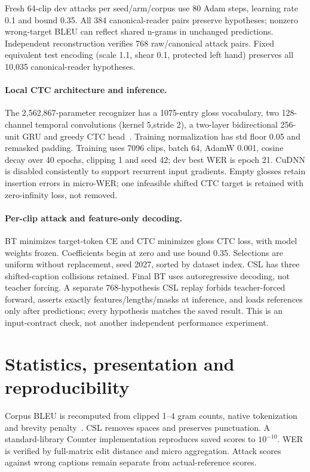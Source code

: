 \documentclass[10pt,twocolumn,letterpaper]{article}
\begin{document}
Fresh 64-clip dev attacks per seed/arm/corpus use 80 Adam steps, learning rate 0.1 and bound 0.35. All 384 canonical-reader pairs preserve hypotheses; nonzero wrong-target BLEU can reflect shared n-grams in unchanged predictions. Independent reconstruction verifies 768 raw/canonical attack pairs. Fixed equivalent test encoding (scale 1.1, shear 0.1, protected left hand) preserves all 10,035 canonical-reader hypotheses.

\paragraph{Local CTC architecture and inference.}
The 2,562,867-parameter recognizer has a 1075-entry gloss vocabulary, two 128-channel temporal convolutions (kernel 5,stride 2), a two-layer bidirectional 256-unit GRU and greedy CTC head~\cite{graves2006}. Training normalization has std floor 0.05 and remasked padding. Training uses 7096 clips, batch 64, AdamW 0.001, cosine decay over 40 epochs, clipping 1 and seed 42; dev best WER is epoch 21. CuDNN is disabled consistently to support recurrent input gradients. Empty glosses retain insertion errors in micro-WER; one infeasible shifted CTC target is retained with zero-infinity loss, not removed.

\paragraph{Per-clip attack and feature-only decoding.}
BT minimizes target-token CE and CTC minimizes gloss CTC loss, with model weights frozen. Coefficients begin at zero and use bound 0.35. Selections are uniform without replacement, seed 2027, sorted by dataset index. CSL has three shifted-caption collisions retained. Final BT uses autoregressive decoding, not teacher forcing. A separate 768-hypothesis CSL replay forbids teacher-forced forward, asserts exactly features/lengths/masks at inference, and loads references only after predictions; every hypothesis matches the saved result. This is an input-contract check, not another independent performance experiment.


\section{Statistics, presentation and reproducibility}
Corpus BLEU is recomputed from clipped 1--4 gram counts, native tokenization and brevity penalty~\cite{papineni2002,post2018}. CSL removes spaces and preserves punctuation. A standard-library Counter implementation reproduces saved scores to $10^{-10}$. WER is verified by full-matrix edit distance and micro aggregation. Attack scores against wrong captions remain separate from actual-reference scores.
\end{document}
